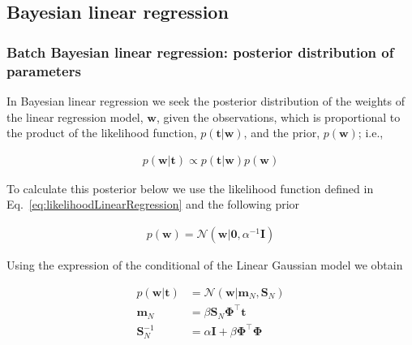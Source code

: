 \subsection{Bayesian linear regression}

\begin{frame}
    \frametitle{Batch Bayesian linear regression: posterior distribution of parameters}

	\scriptsize
	In Bayesian linear regression we seek the posterior distribution of the
weights of the linear regression model, $\mathbf{w}$, given the observations, which
is proportional to the product of the likelihood function,
$p(\mathbf{t}|\mathbf{w})$, and the prior, $p(\mathbf{w})$; i.e.,

	\begin{align}
		p(\mathbf{w}|\mathbf{t})\propto
        p(\mathbf{t}|\mathbf{w})p(\mathbf{w})\label{eq:priorLinearRegression}
	\end{align}

	To calculate this posterior below we use the likelihood function defined in
Eq.~\ref{eq:likelihoodLinearRegression} and the following prior

	\begin{align*}
		p(\mathbf{w})=\mathcal{N}(\mathbf{w}|\mathbf{0},\alpha^{-1}\mathbf{I})
	\end{align*}

	Using the expression of the conditional of the Linear Gaussian model we obtain

	\begin{align}
		p(\mathbf{w}|\mathbf{t})&=\mathcal{N}(\mathbf{w}|\mathbf{m}_N,\mathbf{S}_N)\nonumber\\
		\mathbf{m}_N&=\beta\mathbf{S}_N\boldsymbol{\Phi}^\intercal\mathbf{t}\label{eq:blrPosteriorMean}\\
		\mathbf{S}_N^{-1}&=\alpha\mathbf{I}+\beta\boldsymbol{\Phi}^\intercal\boldsymbol{\Phi}\label{eq:blrPosteriorCov}
	\end{align}

	\normalsize
\end{frame}

